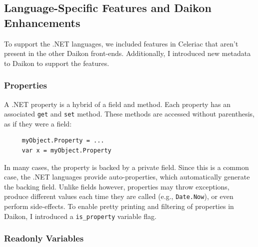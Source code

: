 \documentclass{article}
\begin{document}
\subsection{Language-Specific Features and Daikon Enhancements}

To support the .NET languages, we included features in Celeriac that
aren't present in the other Daikon front-ends. Additionally, I
introduced new metadata to Daikon to support the features.

 \subsubsection{Properties}

 A .NET property is a hybrid of a field and method. Each property has an
 associated \verb|get| and \verb|set| method. These methods are
 accessed without parenthesis, as if they were a field:

 \begin{verbatim}
     myObject.Property = ...
     var x = myObject.Property
 \end{verbatim}

 In many cases, the property is backed by a private field. Since this
 is a common case, the .NET languages provide auto-properties, which
 automatically generate the backing field. Unlike fields however,
 properties may throw exceptions, produce different values each time
 they are called (e.g., \verb|Date.Now|), or even perform
 side-effects.
 To enable pretty printing and filtering of properties in Daikon, I
 introduced a \verb|is_property| variable flag.

\subsubsection{Readonly Variables}
\end{document}
